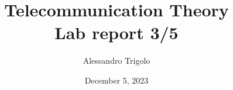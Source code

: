\title{\vspace{160px} \textbf{\huge{Telecommunication Theory}} \\\vspace{17.5px} \LARGE{Lab report 3/5}  \vspace{10px}}
\author{Alessandro Trigolo}
\date{December 5, 2023}


\maketitle \newpage








